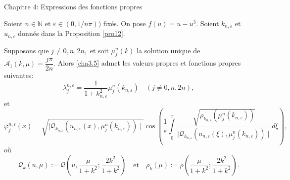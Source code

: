 \documentclass[mathserif,10pt]{beamer}
\begin{document}
\begin{frame}{Chapitre 4: Expressions des fonctions propres}\transglitter[duration=1]
\begin{theorem}\label{th2}
Soient $n \in \mathbb{N}$ et $\varepsilon \in (0,1/n\pi ))$ fixés. 
On pose $f(u)=u-u^{3}.$ 
Soient $k_{n,\varepsilon } $ et  $u_{n,\varepsilon }$
donnés dans la Proposition \ref{pro12}.


 Supposons que $j\neq 0,n,2n,$ et soit $\mu_{j}^{n}(k)$ la solution unique de 
$
\mathcal{A}_{1}(k,\mu )=\dfrac{j\pi}{2n}.
$  Alors \eqref{cha3.5} admet les valeurs propres et fonctions propres suivantes:
 \vspace*{-0.25cm}
 $$
 \lambda_{j}^{n,\varepsilon }=\dfrac{1}{1+k^{2}_{n,\varepsilon }}\mu_{j}^{n}(k_{n,\varepsilon })\quad (j\neq 0,n,2n),
 $$
 \vspace*{-0.5cm}
et
$$
\varphi^{n,\varepsilon }_{j}(x)=\sqrt{\mid \mathcal{Q}_{k_{n,\varepsilon }}(u_{n,\varepsilon }(x),\mu_{j}^{n}(k_{n,\varepsilon }))\mid }\cos\left( \dfrac{1}{\varepsilon }\displaystyle\int\limits_{0}^{x}\dfrac{\sqrt{\rho_{k_{n,\varepsilon }}(\mu_{j}^{n}(k_{n,\varepsilon })) }}{\mid \mathcal{Q}_{k_{n,\varepsilon }}(u_{n,\varepsilon }(\xi ),\mu_{j}^{n}(k_{n,\varepsilon }))\mid   }d\xi \right),
$$
\vspace*{-0.25cm}
où
\vspace*{-0.5cm}
\begin{equation}\label{eq4.7}
\mathcal{Q}_{k}(u,\mu ):= \mathcal{Q}(u,\dfrac{\mu }{1+k^{2}};\dfrac{2k^{2}}{1+k^{2}} ) \quad \mathrm{et}\quad \rho_{k}(\mu ):= \rho (\dfrac{\mu }{1+k^{2}};\dfrac{2k^{2}}{1+k^{2}} ).
\end{equation}
\end{theorem}
\end{frame} 
\end{document}
